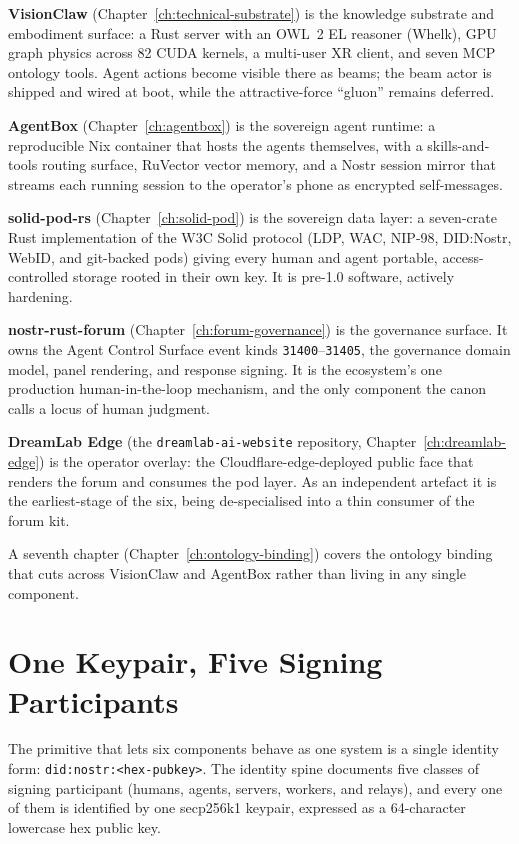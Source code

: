 \textbf{VisionClaw} (Chapter~\ref{ch:technical-substrate}) is the knowledge substrate and embodiment surface: a Rust server with an OWL~2 EL reasoner (Whelk), GPU graph physics across 82 CUDA kernels, a multi-user XR client, and seven MCP ontology tools. Agent actions become visible there as beams; the beam actor is shipped and wired at boot, while the attractive-force ``gluon'' remains deferred.

\textbf{AgentBox} (Chapter~\ref{ch:agentbox}) is the sovereign agent runtime: a reproducible Nix container that hosts the agents themselves, with a skills-and-tools routing surface, RuVector vector memory, and a Nostr session mirror that streams each running session to the operator's phone as encrypted self-messages.

\textbf{solid-pod-rs} (Chapter~\ref{ch:solid-pod}) is the sovereign data layer: a seven-crate Rust implementation of the W3C Solid protocol (LDP, WAC, NIP-98, DID:Nostr, WebID, and git-backed pods) giving every human and agent portable, access-controlled storage rooted in their own key. It is pre-1.0 software, actively hardening.

\textbf{nostr-rust-forum} (Chapter~\ref{ch:forum-governance}) is the governance surface. It owns the Agent Control Surface event kinds \texttt{31400}--\texttt{31405}, the governance domain model, panel rendering, and response signing. It is the ecosystem's one production human-in-the-loop mechanism, and the only component the canon calls a locus of human judgment.

\textbf{DreamLab Edge} (the \texttt{dreamlab-ai-website} repository, Chapter~\ref{ch:dreamlab-edge}) is the operator overlay: the Cloudflare-edge-deployed public face that renders the forum and consumes the pod layer. As an independent artefact it is the earliest-stage of the six, being de-specialised into a thin consumer of the forum kit.

A seventh chapter (Chapter~\ref{ch:ontology-binding}) covers the ontology binding that cuts across VisionClaw and AgentBox rather than living in any single component.

\section{One Keypair, Five Signing Participants}

The primitive that lets six components behave as one system is a single identity form: \texttt{did:nostr:<hex-pubkey>}. The identity spine documents five classes of signing participant (humans, agents, servers, workers, and relays), and every one of them is identified by one secp256k1 keypair, expressed as a 64-character lowercase hex public key.

